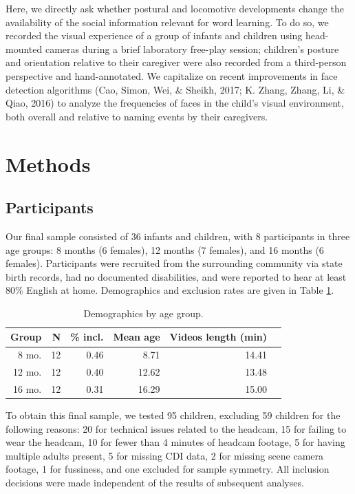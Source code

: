\documentclass[10pt, letterpaper]{article}
\begin{document}
Here, we directly ask whether postural and locomotive developments
change the availability of the social information relevant for word
learning. To do so, we recorded the visual experience of a group of
infants and children using head-mounted cameras during a brief
laboratory free-play session; children's posture and orientation
relative to their caregiver were also recorded from a third-person
perspective and hand-annotated. We capitalize on recent improvements in
face detection algorithms (Cao, Simon, Wei, \& Sheikh, 2017; K. Zhang,
Zhang, Li, \& Qiao, 2016) to analyze the frequencies of faces in the
child's visual environment, both overall and relative to naming events
by their caregivers.

\section{Methods}\label{methods}

\subsection{Participants}\label{participants}

Our final sample consisted of 36 infants and children, with 8
participants in three age groups: 8 months (6 females), 12 months (7
females), and 16 months (6 females). Participants were recruited from
the surrounding community via state birth records, had no documented
disabilities, and were reported to hear at least 80\% English at home.
Demographics and exclusion rates are given in Table \ref{tab:pop}.

\begin{table}[H]
\centering
\begin{tabular}{rrrrrr}
  \hline
 Group & N & \% incl. & Mean age & Videos length (min) \\ 
  \hline
   8 mo. &   12 & 0.46 & 8.71 & 14.41 \\ 
   12 mo. &  12 & 0.40 & 12.62 & 13.48 \\ 
   16 mo. &  12 & 0.31 & 16.29 & 15.00\\ 
   \hline
\end{tabular}
\caption{\label{tab:pop} Demographics by age group.}
\end{table}

To obtain this final sample, we tested 95 children, excluding 59
children for the following reasons: 20 for technical issues related to
the headcam, 15 for failing to wear the headcam, 10 for fewer than 4
minutes of headcam footage, 5 for having multiple adults present, 5 for
missing CDI data, 2 for missing scene camera footage, 1 for fussiness,
and one excluded for sample symmetry. All inclusion decisions were made
independent of the results of subsequent analyses.
\end{document}
